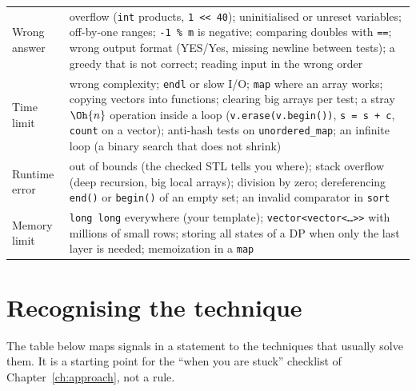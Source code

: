 \begin{center}
\small
\begin{tabularx}{\linewidth}{p{2.3cm}L}
\toprule
{} &  \\
\midrule
Wrong answer & overflow (\texttt{int} products, \texttt{1 \textless\textless{} 40}); uninitialised or unreset variables; off-by-one
  ranges; \texttt{-1 \% m} is negative; comparing doubles with \texttt{==}; wrong output format (YES/Yes, missing newline between
  tests); a greedy that is not correct; reading input in the wrong order \\
Time limit & wrong complexity; \texttt{endl} or slow I/O; \texttt{map} where an array works; copying vectors into functions;
  clearing big arrays per test; a stray $\Oh{n}$ operation inside a loop (\texttt{v.erase(v.begin())}, \texttt{s = s + c},
  \texttt{count} on a vector); anti-hash tests on \texttt{unordered\_map}; an infinite loop (a binary search that does not shrink) \\
Runtime error & out of bounds (the checked STL tells you where); stack overflow (deep recursion, big local arrays); division by
  zero; dereferencing \texttt{end()} or \texttt{begin()} of an empty set; an invalid comparator in \texttt{sort} \\
Memory limit & \texttt{long long} everywhere (your template); \texttt{vector\textless vector\textless\ldots\textgreater\textgreater}
  with millions of small rows; storing all states of a DP when only the last layer is needed; memoization in a \texttt{map} \\
\bottomrule
\end{tabularx}
\end{center}

\section[Recognising the technique]{Recognising the technique \hfill \silver}

The table below maps signals in a statement to the techniques that usually solve them. It is a starting point for the ``when
you are stuck'' checklist of Chapter~\ref{ch:approach}, not a rule.

